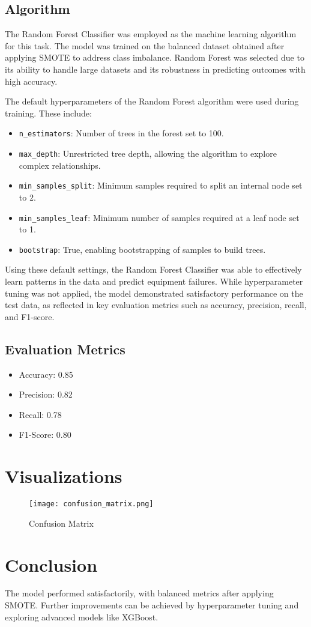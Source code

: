 \documentclass[a4paper,12pt]{article}
\begin{document}
	\subsection{Algorithm}
	The Random Forest Classifier was employed as the machine learning algorithm for this task. The model was trained on the balanced dataset obtained after applying SMOTE to address class imbalance. Random Forest was selected due to its ability to handle large datasets and its robustness in predicting outcomes with high accuracy.
	
	The default hyperparameters of the Random Forest algorithm were used during training. These include:
	\begin{itemize}
		\item \texttt{n\_estimators}: Number of trees in the forest set to 100.
		\item \texttt{max\_depth}: Unrestricted tree depth, allowing the algorithm to explore complex relationships.
		\item \texttt{min\_samples\_split}: Minimum samples required to split an internal node set to 2.
		\item \texttt{min\_samples\_leaf}: Minimum number of samples required at a leaf node set to 1.
		\item \texttt{bootstrap}: True, enabling bootstrapping of samples to build trees.
	\end{itemize}
	
	Using these default settings, the Random Forest Classifier was able to effectively learn patterns in the data and predict equipment failures. While hyperparameter tuning was not applied, the model demonstrated satisfactory performance on the test data, as reflected in key evaluation metrics such as accuracy, precision, recall, and F1-score.
	
	
	\subsection{Evaluation Metrics}
	\begin{itemize}
		\item Accuracy: 0.85
		\item Precision: 0.82
		\item Recall: 0.78
		\item F1-Score: 0.80
	\end{itemize}
	
	\section{Visualizations}
	\begin{figure}[h!]
		\centering
		\texttt{[image: confusion\_matrix.png]}
		\caption{Confusion Matrix}
		\label{fig:confusion}
	\end{figure}
	
	\section{Conclusion}
	The model performed satisfactorily, with balanced metrics after applying SMOTE. Further improvements can be achieved by hyperparameter tuning and exploring advanced models like XGBoost.
	
\end{document}
